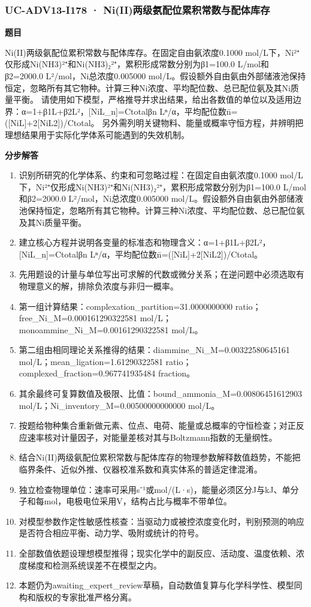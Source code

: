 \documentclass[UTF8,11pt,a4paper]{ctexart}
\begin{document}
\subsubsection*{UC-ADV13-I178 · Ni(II)两级氨配位累积常数与配体库存}
\noindent\textbf{题目}\par
Ni(II)两级氨配位累积常数与配体库存。在固定自由氨浓度0.1000 mol/L下，Ni²⁺仅形成Ni(NH3)²⁺和Ni(NH3)₂²⁺，累积形成常数分别为β1=100.0 L/mol和β2=2000.0 L²/mol，Ni总浓度0.005000 mol/L。假设额外自由氨由外部储液池保持恒定，忽略所有其它物种。计算三种Ni浓度、平均配位数、总已配位氨及其Ni质量平衡。 请使用如下模型，严格推导并求出结果，给出各数值的单位以及适用边界：α=1+β1L+β2L²，[NiL\_n]=Ctotalβn Lⁿ/α，平均配位数n̄=([NiL]+2[NiL2])/Ctotal。 另外需列明关键物料、能量或概率守恒方程，并辨明把理想结果用于实际化学体系可能遇到的失效机制。\par
\medskip\noindent\textbf{分步解答}
\begin{enumerate}
\item 识别所研究的化学体系、约束和可忽略过程：在固定自由氨浓度0.1000 mol/L下，Ni²⁺仅形成Ni(NH3)²⁺和Ni(NH3)₂²⁺，累积形成常数分别为β1=100.0 L/mol和β2=2000.0 L²/mol，Ni总浓度0.005000 mol/L。假设额外自由氨由外部储液池保持恒定，忽略所有其它物种。计算三种Ni浓度、平均配位数、总已配位氨及其Ni质量平衡。
\item 建立核心方程并说明各变量的标准态和物理含义：α=1+β1L+β2L²，[NiL\_n]=Ctotalβn Lⁿ/α，平均配位数n̄=([NiL]+2[NiL2])/Ctotal。
\item 先用题设的计量与单位写出可求解的代数或微分关系；在逆问题中必须选取有物理意义的解，排除负浓度与非归一概率。
\item 第一组计算结果：complexation\_partition=31.0000000000 ratio；free\_Ni\_M=0.000161290322581 mol/L；monoammine\_Ni\_M=0.00161290322581 mol/L。
\item 第二组由相同理论关系推得的结果：diammine\_Ni\_M=0.00322580645161 mol/L；mean\_ligation=1.61290322581 ratio；complexed\_fraction=0.967741935484 fraction。
\item 其余最终可复算数值及极限、比值：bound\_ammonia\_M=0.00806451612903 mol/L；Ni\_inventory\_M=0.00500000000000 mol/L。
\item 按题给物种集合重新做元素、位点、电荷、能量或总概率的守恒检查；对正反应速率核对计量因子，对能量差核对其与Boltzmann指数的无量纲性。
\item 结合Ni(II)两级氨配位累积常数与配体库存的物理参数解释数值趋势，不能把临界条件、近似外推、仪器校准系数和真实体系的普适定律混淆。
\item 独立检查物理单位：速率可采用s⁻¹或mol/(L·s)，能量必须区分J与kJ、单分子和每mol，电极电位采用V，结构占比与概率不带单位。
\item 对模型参数作定性敏感性核查：当驱动力或被控浓度变化时，判别预测的响应是否符合相应平衡、动力学、吸附或统计的符号。
\item 全部数值依题设理想模型推得；现实化学中的副反应、活动度、温度依赖、浓度梯度和检测系统误差不在模型之内。
\item 本题仍为awaiting\_expert\_review草稿，自动数值复算与化学科学性、模型同构和版权的专家批准严格分离。
\end{enumerate}
\end{document}
